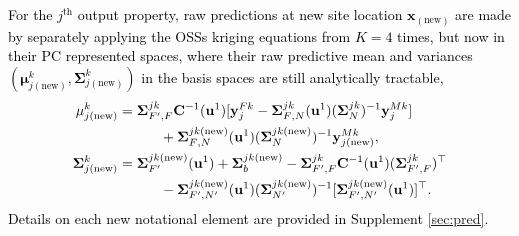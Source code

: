 \documentclass[12pt]{article}
\newcommand{\blu}[1]{\textcolor{black}{#1}} %
\newcommand{\blunew}[1]{\textcolor{black}{#1}} %
\begin{document}
\blu{
For the $j^{\mathrm{th}}$ output property, raw predictions at new site location $\mathbf{x}_{\mathrm{(new)}}$
are made by separately applying the OSSs kriging equations from \cite{Huang:2018} $K=4$ times,
but now in their PC represented spaces, where their raw predictive mean and variances 
\blunew{$(\mathbf{\mu}^k_{j\mathrm{(new)}}, \mathbf{\Sigma}^k_{j\mathrm{(new)}} )$}
in the basis spaces are still analytically tractable, 
\blunew{
\begin{align}
\mathbf{\mu}^k_{j\mathrm{(new)}} &= \mathbf{\Sigma}^{jk}_{\blunew{F}', \blunew{F}} 
 \mathbf{C}^{-1}(\mathbf{u}^1)[ \mathbf{y}^{Fk}_j -
\mathbf{\Sigma}^{jk}_{\blunew{F}, N}(\mathbf{u}^1)
(\mathbf{\Sigma}^{jk}_{N}) ^{-1} 
  \mathbf{y}^{Mk}_j]  \nonumber \\
  & \quad\quad\quad
+ \mathbf{\Sigma}^{jk\mathrm{(new)}}_{\blunew{F}, N}(\mathbf{u}^1)
(\mathbf{\Sigma}^{jk\mathrm{(new)}}_{N}) ^{-1} 
 \mathbf{y}^{Mk}_{j\mathrm{(new)}}, \nonumber \\
\mathbf{\Sigma}^k_{j\mathrm{(new)}} &=  \label{eq:vnew}
\mathbf{\Sigma}^{jk\mathrm{(new)}}_{\blunew{F}'}(\mathbf{u}^1)  + \mathbf{\Sigma}^{jk\mathrm{(new)}}_{b}  -
\mathbf{\Sigma}^{jk}_{\blunew{F}', \blunew{F}} \mathbf{C}^{-1}(\mathbf{u}^1)
 (\mathbf{\Sigma}^{jk}_{\blunew{F}', \blunew{F}} )^\top \\
&\quad\quad\quad  -\mathbf{\Sigma}^{jk\mathrm{(new)}}_{\blunew{F}', N'}(\mathbf{u}^1) (\mathbf{\Sigma}^{jk\mathrm{(new)}}_{N'})^{-1}   
  [\mathbf{\Sigma}^{jk\mathrm{(new)}}_{\blunew{F}', N'}(\mathbf{u}^1) ]^\top. \nonumber 
\end{align}}
Details on each new notational element are provided in Supplement \ref{sec:pred}. 
}
\end{document}

